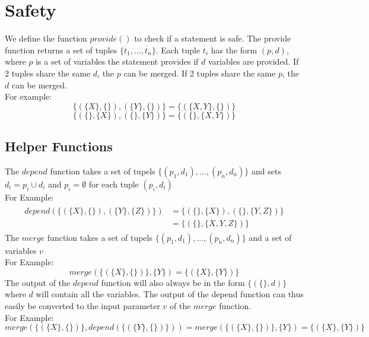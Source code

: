 \documentclass{article}
\newcommand{\tuple}[1]{\dot{#1}}
\newcommand{\provide}[2]{\{(\{#1\}, \{#2\})\}}
\newcommand{\provideM}[4]{\{(\{#1\}, \{#2\}), (\{#3\},\{#4\})\}}
\begin{document}
	\section{Safety}
	We define the function $\mathit{provide()}$ to check if a statement is safe. The provide function returns a set of tuples $\{\tuple{t_1}, ..., \tuple{t_n}\}$. Each tuple $\tuple{t_i}$ 
	has the form $(p, d)$, where $p$ is a set of variables the statement provides if $d$ variables are provided. If 2 tuples share the same $d$, the $p$ can be merged. If 2 tuples share the same $p$, the $d$ can be merged.
	\\ For example:
	\begin{equation}
		\provideM{X}{}{Y}{} = \provide{X,Y}{}
	\end{equation}
	\begin{equation}
		\provideM{}{X}{}{Y} = \provide{}{X,Y}
	\end{equation}

	\subsection{Helper Functions}
	The $\mathit{depend}$ function takes a set of tupels $\{(p_1, d_1), ..., (p_n, d_n)\}$ and sets $d_i = p_i \cup d_i$ and $p_i = \emptyset$ for each tuple $(p_i, d_i)$
	\\ For Example:
	\begin{align}
		\begin{split}
			depend(\provideM{X}{}{Y}{Z})
			&= \provideM{}{X}{}{Y,Z} \\
			&= \provide{}{X,Y,Z}
		\end{split}
	\end{align}
	The $\mathit{merge}$ function takes a set of tupels $\{(p_1, d_1), ..., (p_n, d_n)\}$ and a set of variables $v$
	\\ For Example:
	\begin{dmath}
		merge(\provide{X}{}, \{Y\})
			= \provide{X}{Y}
	\end{dmath}
	The output of the $\mathit{depend}$ function will also always be in the form $\{(\{\}, d)\}$ where $d$ will contain all the variables. 
	The output of the depend function can thus easily be converted to the input parameter $v$ of the $\mathit{merge}$ function.
	\\ For Example:
	\begin{dmath}
		merge(\provide{X}{}, depend(\provide{Y}{})) = merge(\provide{X}{}, \{Y\})
			= \provide{X}{Y}
	\end{dmath}
\end{document}
